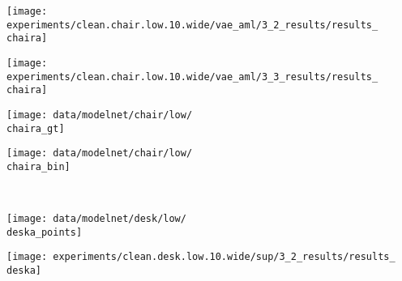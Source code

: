 {\begin{minipage}[t]{0.10\textwidth}
	\vspace{0px}\centering
	\texttt{[image: experiments/clean.chair.low.10.wide/vae\_aml/3\_2\_results/results\_\\chaira]}
\end{minipage}
\begin{minipage}[t]{0.10\textwidth}
	\vspace{0px}\centering
	\texttt{[image: experiments/clean.chair.low.10.wide/vae\_aml/3\_3\_results/results\_\\chaira]}
\end{minipage}
\begin{minipage}[t]{0.10\textwidth}
	\vspace{0px}\centering
	\texttt{[image: data/modelnet/chair/low/\\chaira\_gt]}
\end{minipage}
\begin{minipage}[t]{0.10\textwidth}
	\vspace{0px}\centering
	\texttt{[image: data/modelnet/chair/low/\\chaira\_bin]}
\end{minipage}
\\[-2px]
\hspace*{-6px}
\begin{minipage}[t]{0.02\textwidth}
    \vspace{0px}\centering
    \vspace{2.5mm}
\end{minipage}
\begin{minipage}[t]{0.10\textwidth}
	\vspace{0px}\centering
	\texttt{[image: data/modelnet/desk/low/\\deska\_points]}
\end{minipage}
\begin{minipage}[t]{0.10\textwidth}
	\vspace{0px}\centering
	\texttt{[image: experiments/clean.desk.low.10.wide/sup/3\_2\_results/results\_\\deska]}

\end{minipage}}
